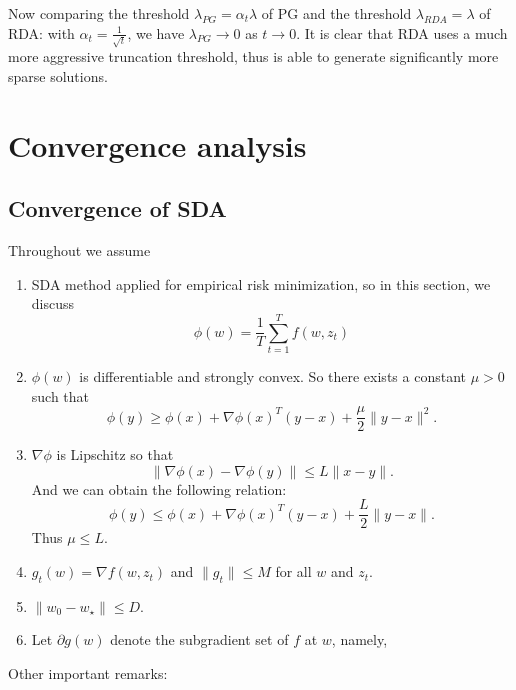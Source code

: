 Now comparing the threshold $\lambda_{PG}=\alpha_t \lambda$ of PG and the threshold $\lambda_{RDA}=\lambda$ of RDA:
with $\alpha_t=\frac{1}{\sqrt{t}}$, we have $\lambda_{PG} \rightarrow 0$ as $t \rightarrow 0$.
It is clear that RDA uses a much more aggressive truncation threshold, thus is able to generate significantly more sparse solutions.

\section{Convergence analysis}
\subsection{Convergence of SDA}
Throughout we assume
\begin{enumerate}
	\item SDA method applied for empirical risk minimization, so in this section, we discuss
	\begin{equation*}
		\phi(w)=\frac{1}{T}\sum_{t=1}^{T} f(w,z_t)
	\end{equation*}
	
	\item
	$\phi(w)$ is differentiable and strongly convex. So there exists a constant $\mu >0$ such that 
	\begin{equation}
		\phi(y) \geq \phi(x) + \nabla \phi(x)^T (y-x)+\frac{\mu}{2} \|y-x\|^2.
	\end{equation}
	
	\item
	$\nabla \phi$ is Lipschitz so that
	\begin{equation}
		\|\nabla \phi(x) - \nabla \phi(y)\| \leq L \|x-y\|.
	\end{equation}
	And we can obtain the following relation:
	\begin{equation}
		\phi(y) \leq \phi(x)+\nabla \phi(x)^T (y-x) +\frac{L}{2} \|y-x\|.
	\end{equation}
	Thus $\mu \leq L$.
	
	\item
	$g_t(w) = \nabla f(w,z_t)$ and $\|g_t\|\leq M$ for all $w$ and $z_t$.
	
	\item
	$\|w_0- w_\star\| \leq D$.
	
	\item Let $\partial g(w)$ denote the subgradient set of $f$ at $w$, namely,
	
	
\end{enumerate}
Other important remarks:
